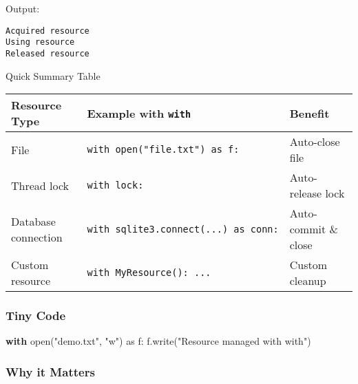 \documentclass[
  letterpaper,
  DIV=11,
  numbers=noendperiod]{scrreprt}
\newenvironment{Shaded}{\begin{snugshade}}{\end{snugshade}}
\newcommand{\BuiltInTok}[1]{\textcolor[rgb]{0.00,0.23,0.31}{#1}}
\newcommand{\ControlFlowTok}[1]{\textcolor[rgb]{0.00,0.23,0.31}{\textbf{#1}}}
\newcommand{\ImportTok}[1]{\textcolor[rgb]{0.00,0.46,0.62}{#1}}
\newcommand{\NormalTok}[1]{\textcolor[rgb]{0.00,0.23,0.31}{#1}}
\newcommand{\StringTok}[1]{\textcolor[rgb]{0.13,0.47,0.30}{#1}}
\begin{document}
Output:

\begin{verbatim}
Acquired resource
Using resource
Released resource
\end{verbatim}

Quick Summary Table

\begin{longtable}[]{@{}
  >{\raggedright\arraybackslash}p{}
  >{\raggedright\arraybackslash}p{}
  >{\raggedright\arraybackslash}p{}@{}}
\toprule\noalign{}
\begin{minipage}[b]{\linewidth}\raggedright
Resource Type
\end{minipage} & \begin{minipage}[b]{\linewidth}\raggedright
Example with \texttt{with}
\end{minipage} & \begin{minipage}[b]{\linewidth}\raggedright
Benefit
\end{minipage} \\
\midrule\noalign{}
\endhead
\bottomrule\noalign{}
\endlastfoot
File & \texttt{with\ open("file.txt")\ as\ f:} & Auto-close file \\
Thread lock & \texttt{with\ lock:} & Auto-release lock \\
Database connection & \texttt{with\ sqlite3.connect(...)\ as\ conn:} &
Auto-commit \& close \\
Custom resource & \texttt{with\ MyResource():\ ...} & Custom cleanup \\
\end{longtable}

\subsubsection{Tiny Code}\label{tiny-code-87}

\begin{Shaded}
\begin{Highlighting}[]
\ControlFlowTok{with} \BuiltInTok{open}\NormalTok{(}\StringTok{"demo.txt"}\NormalTok{, }\StringTok{"w"}\NormalTok{) }\ImportTok{as}\NormalTok{ f:}
\NormalTok{    f.write(}\StringTok{"Resource managed with \textquotesingle{}with\textquotesingle{}"}\NormalTok{)}
\end{Highlighting}
\end{Shaded}

\subsubsection{Why it Matters}\label{why-it-matters-87}
\end{document}

